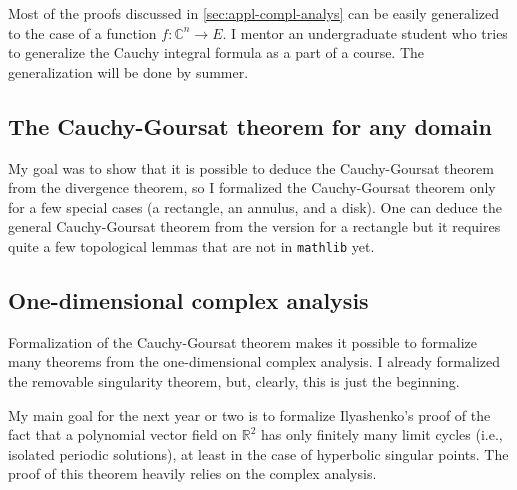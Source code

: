 \documentclass[a4paper, UKenglish,cleveref, autoref, thm-restate]{lipics-v2021}
\newcommand{\bbR}{\mathbb{R}}
\newcommand{\bbC}{\mathbb{C}}
\begin{document}
Most of the proofs discussed in \autoref{sec:appl-compl-analys} can be
easily generalized to the case of a function
\(f\colon \bbC^{n}\to E\). I mentor an undergraduate student who tries
to generalize the Cauchy integral formula as a part of a course. The
generalization will be done by summer.

\subsection{The Cauchy-Goursat theorem for any domain}\label{sec:cauchy-goursat-any}

My goal was to show that it is possible to deduce the Cauchy-Goursat
theorem from the divergence theorem, so I formalized the
Cauchy-Goursat theorem only for a few special cases (a rectangle, an
annulus, and a disk). One can deduce the general Cauchy-Goursat
theorem from the version for a rectangle but it requires quite a few
topological lemmas that are not in \texttt{mathlib} yet.

\subsection{One-dimensional complex analysis}%
\label{sec:one-dimens-compl}

Formalization of the Cauchy-Goursat theorem makes it possible to
formalize many theorems from the one-dimensional complex analysis. I
already formalized the removable singularity theorem, but, clearly,
this is just the beginning.

My main goal for the next year or two is to formalize Ilyashenko's
proof of the fact that a polynomial vector field on \(\bbR^{2}\) has
only finitely many limit cycles (i.e., isolated periodic solutions),
at least in the case of hyperbolic singular points. The proof of this
theorem heavily relies on the complex analysis.


\end{document}
